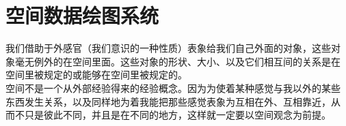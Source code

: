 
\section{空间数据绘图系统}

\begin{frame}[c]{\subsecname}{}
      \begin{ornamentblock}%
\hspace*{2em}我们借助于外感官（我们意识的一种性质）表象给我们自己外面的对象，这些对
象毫无例外的在空间里面。这些对象的形状、大小、以及它们相互间的关系是在
空间里被规定的或能够在空间里被规定的。\\
\hspace*{2em}空间不是一个从外部经验得来的经验概念。因为为使着某种感觉与我以外的某些
东西发生关系，以及同样地为着我能把那些感觉表象为互相在外、互相靠近，从
而不只是彼此不同，并且是在不同的地方，这样就一定要以空间观念为前提。\\
      \end{ornamentblock}
\end{frame}



